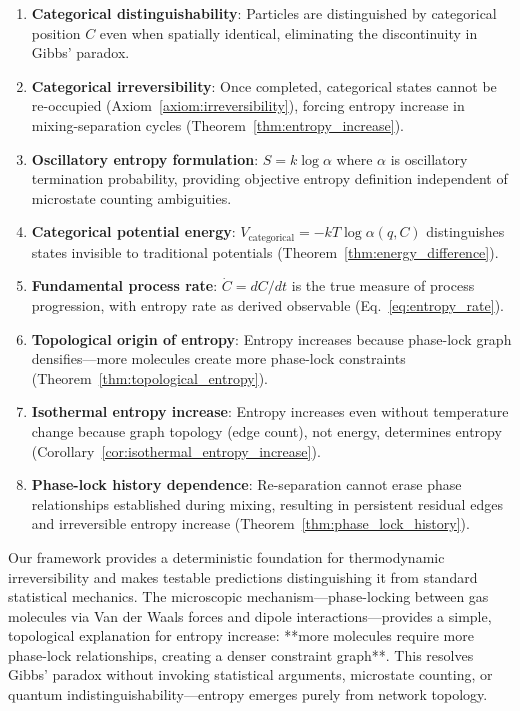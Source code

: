 \documentclass[12pt,a4paper]{article}
\theoremstyle{remark}
\begin{document}
\begin{enumerate}
\item \textbf{Categorical distinguishability}: Particles are distinguished by categorical position $C$ even when spatially identical, eliminating the discontinuity in Gibbs' paradox.

\item \textbf{Categorical irreversibility}: Once completed, categorical states cannot be re-occupied (Axiom~\ref{axiom:irreversibility}), forcing entropy increase in mixing-separation cycles (Theorem~\ref{thm:entropy_increase}).

\item \textbf{Oscillatory entropy formulation}: $S = k \log \alpha$ where $\alpha$ is oscillatory termination probability, providing objective entropy definition independent of microstate counting ambiguities.

\item \textbf{Categorical potential energy}: $V_\text{categorical} = -kT \log \alpha(q, C)$ distinguishes states invisible to traditional potentials (Theorem~\ref{thm:energy_difference}).

\item \textbf{Fundamental process rate}: $\dot{C} = dC/dt$ is the true measure of process progression, with entropy rate as derived observable (Eq.~\eqref{eq:entropy_rate}).

\item \textbf{Topological origin of entropy}: Entropy increases because phase-lock graph densifies—more molecules create more phase-lock constraints (Theorem~\ref{thm:topological_entropy}).

\item \textbf{Isothermal entropy increase}: Entropy increases even without temperature change because graph topology (edge count), not energy, determines entropy (Corollary~\ref{cor:isothermal_entropy_increase}).

\item \textbf{Phase-lock history dependence}: Re-separation cannot erase phase relationships established during mixing, resulting in persistent residual edges and irreversible entropy increase (Theorem~\ref{thm:phase_lock_history}).
\end{enumerate}

Our framework provides a deterministic foundation for thermodynamic irreversibility and makes testable predictions distinguishing it from standard statistical mechanics. The microscopic mechanism—phase-locking between gas molecules via Van der Waals forces and dipole interactions—provides a simple, topological explanation for entropy increase: **more molecules require more phase-lock relationships, creating a denser constraint graph**. This resolves Gibbs' paradox without invoking statistical arguments, microstate counting, or quantum indistinguishability—entropy emerges purely from network topology.
\end{document}
